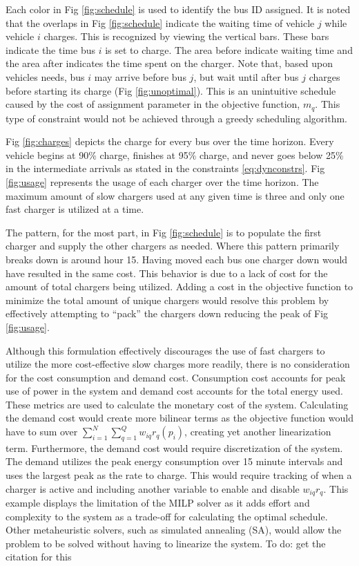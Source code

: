 \documentclass[letterpaper, 10pt, conference]{IEEEtran}
\newcommand{\TODO}[1]{{\color{green} To do: #1}}                                %
\begin{document}
Each color in Fig \ref{fig:schedule} is used to identify the bus ID assigned. It is noted that the overlaps in Fig
\ref{fig:schedule} indicate the waiting time of vehicle $j$ while vehicle $i$ charges. This is recognized by viewing the
vertical bars. These bars indicate the time bus $i$ is set to charge. The area before indicate waiting time and the area
after indicates the time spent on the charger. Note that, based upon vehicles needs, bus $i$ may arrive before bus $j$,
but wait until after bus $j$ charges before starting its charge (Fig \ref{fig:unoptimal}). This is an unintuitive
schedule caused by the cost of assignment parameter in the objective function, $m_q$. This type of constraint would not
be achieved through a greedy scheduling algorithm.

Fig \ref{fig:charges} depicts the charge for every bus over the time horizon. Every vehicle begins at 90\% charge,
finishes at 95\% charge, and never goes below 25\% in the intermediate arrivals as stated in the constraints
\eqref{eq:dynconstrs}. Fig \ref{fig:usage} represents the usage of each charger over the time horizon. The maximum
amount of slow chargers used at any given time is three and only one fast charger is utilized at a time.

The pattern, for the most part, in Fig \ref{fig:schedule} is to populate the first charger and supply the other chargers
as needed. Where this pattern primarily breaks down is around hour 15. Having moved each bus one charger down would have
resulted in the same cost. This behavior is due to a lack of cost for the amount of total chargers being utilized.
Adding a cost in the objective function to minimize the total amount of unique chargers would resolve this problem by
effectively attempting to ``pack'' the chargers down reducing the peak of Fig \ref{fig:usage}.

Although this formulation effectively discourages the use of fast chargers to utilize the more cost-effective slow
charges more readily, there is no consideration for the cost consumption and demand cost. Consumption cost accounts for
peak use of power in the system and demand cost accounts for the total energy used. These metrics are used to calculate
the monetary cost of the system. Calculating the demand cost would create more bilinear terms as the objective function
would have to sum over $\sum_{i=1}^N \sum_{q=1}^Q w_{iq}{r_q}(p_i)$, creating yet another linearization term. Furthermore, the
demand cost would require discretization of the system. The demand utilizes the peak energy consumption over 15 minute
intervals and uses the largest peak as the rate to charge. This would require tracking of when a charger is active and
including another variable to enable and disable $w_{iq}r_q$. This example displays the limitation of the MILP solver as
it adds effort and complexity to the system as a trade-off for calculating the optimal schedule. Other metaheuristic
solvers, such as simulated annealing (SA), would allow the problem to be solved without having to linearize the system.
\TODO{get the citation for this}
\end{document}
